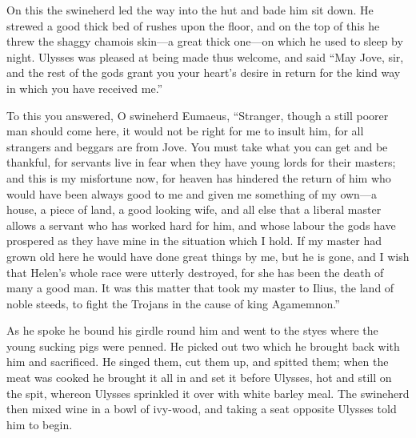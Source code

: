 On this the swineherd led the way into the hut and bade him sit down. He
strewed a good thick bed of rushes upon the floor, and on the top of this he
threw the shaggy chamois skin—a great thick one—on which he used to sleep by
night. Ulysses was pleased at being made thus welcome, and said “May Jove, sir,
and the rest of the gods grant you your heart’s desire in return for the kind
way in which you have received me.”

To this you answered, O swineherd Eumaeus, “Stranger, though a still poorer man
should come here, it would not be right for me to insult him, for all strangers
and beggars are from Jove. You must take what you can get and be thankful, for
servants live in fear when they have young lords for their masters; and this is
my misfortune now, for heaven has hindered the return of him who would have
been always good to me and given me something of my own—a house, a piece of
land, a good looking wife, and all else that a liberal master allows a servant
who has worked hard for him, and whose labour the gods have prospered as they
have mine in the situation which I hold. If my master had grown old here he
would have done great things by me, but he is gone, and I wish that Helen’s
whole race were utterly destroyed, for she has been the death of many a good
man. It was this matter that took my master to Ilius, the land of noble steeds,
to fight the Trojans in the cause of king Agamemnon.”

As he spoke he bound his girdle round him and went to the styes where the young
sucking pigs were penned. He picked out two which he brought back with him and
sacrificed. He singed them, cut them up, and spitted them; when the meat was
cooked he brought it all in and set it before Ulysses, hot and still on the
spit, whereon Ulysses sprinkled it over with white barley meal. The swineherd
then mixed wine in a bowl of ivy-wood, and taking a seat opposite Ulysses told
him to begin.

